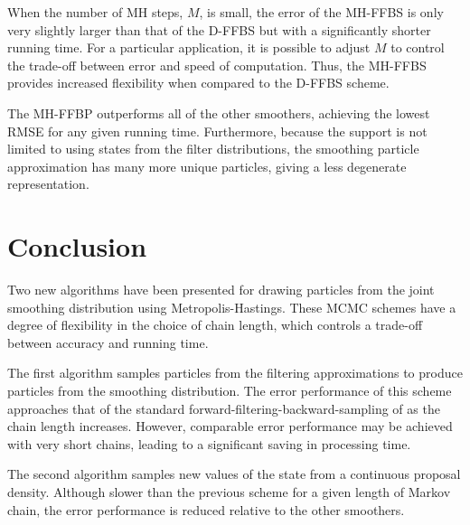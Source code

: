 \documentclass[10pt,twocolumn,twoside]{IEEEtran}
\begin{document}
When the number of MH steps, $M$, is small, the error of the MH-FFBS is only very slightly larger than that of the D-FFBS but with a significantly shorter running time. For a particular application, it is possible to adjust $M$ to control the trade-off between error and speed of computation. Thus, the MH-FFBS provides increased flexibility when compared to the D-FFBS scheme.

The MH-FFBP outperforms all of the other smoothers, achieving the lowest RMSE for any given running time. Furthermore, because the support is not limited to using states from the filter distributions, the smoothing particle approximation has many more unique particles, giving a less degenerate representation.



\section{Conclusion} \label{sec:conclusions}
Two new algorithms have been presented for drawing particles from the joint smoothing distribution using Metropolis-Hastings. These MCMC schemes have a degree of flexibility in the choice of chain length, which controls a trade-off between accuracy and running time.

The first algorithm samples particles from the filtering approximations to produce particles from the smoothing distribution. The error performance of this scheme approaches that of the standard forward-filtering-backward-sampling of \cite{Godsill2004} as the chain length increases. However, comparable error performance may be achieved with very short chains, leading to a significant saving in processing time.

The second algorithm samples new values of the state from a continuous proposal density. Although slower than the previous scheme for a given length of Markov chain, the error performance is reduced relative to the other smoothers.













%
%
\end{document}
